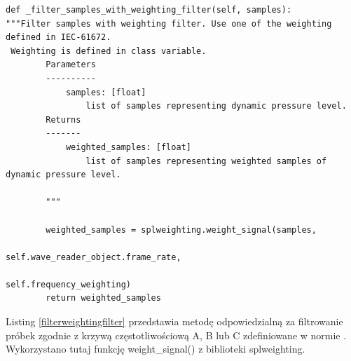 \documentclass[eng,printmode]{mgr}
\begin{document}
\begin{minipage}{\linewidth}
\begin{lstlisting}[caption={fragment kodu źródłowego pliku SampledBConverter.py, klasa SamplesDbSPLConverter, metoda \_filter\_samples\_with\_weighting\_filter},captionpos=b,label={filterweightingfilter}]
   def _filter_samples_with_weighting_filter(self, samples):
"""Filter samples with weighting filter. Use one of the weighting defined in IEC-61672.
 Weighting is defined in class variable.
        Parameters
        ----------
            samples: [float]
                list of samples representing dynamic pressure level.
        Returns
        -------
            weighted_samples: [float]
                list of samples representing weighted samples of dynamic pressure level.

        """

        weighted_samples = splweighting.weight_signal(samples,
                                                      self.wave_reader_object.frame_rate,
                                                      self.frequency_weighting)
        return weighted_samples
\end{lstlisting}
\end{minipage}

Listing \ref{filterweightingfilter} przedstawia metodę odpowiedzialną za filtrowanie próbek zgodnie z krzywą częstotliwościową A, B lub C zdefiniowane w normie \cite{IEC-61672-2013}. Wykorzystano tutaj funkcję weight\_signal() z biblioteki splweighting.\cite{splweighting}
\appendix
{} %

\listoffigures
\lstlistoflistings
\end{document}
